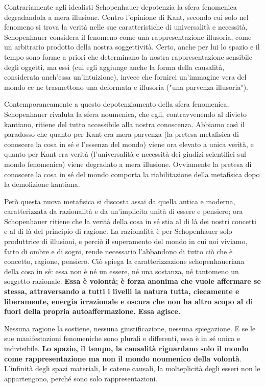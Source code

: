 Contrariamente agli idealisti Schopenhauer depotenzia la sfera fenomenica degradandola a mera illusione. Contro l’opinione di Kant, secondo cui solo nel fenomeno si trova la verità nelle sue caratteristiche di universalità e necessità, Schopenhauer considera il fenomeno come una rappresentazione illusoria, come un arbitrario prodotto della nostra soggettività. Certo, anche per lui lo spazio e il tempo sono forme a priori che determinano la nostra rappresentazione sensibile degli oggetti, ma essi (cui egli aggiunge anche la forma della causalità, considerata anch’essa un’intuizione), invece che fornirci un’immagine vera del mondo ce ne trasmettono una deformata e illusoria ("una parvenza illusoria").

Contemporaneamente a questo depotenziamento della sfera fenomenica, Schopenhauer rivaluta la sfera noumenica, che egli, contravvenendo al divieto kantiano, ritiene del tutto accessibile alla nostra conoscenza. Abbiamo così il paradosso che quanto per Kant era mera parvenza (la pretesa metafisica di conoscere la cosa in sé e l’essenza del mondo) viene ora elevato a unica verità, e quanto per Kant era verità (l’universalità e necessità dei giudizi scientifici sul mondo fenomenico) viene degradato a mera illusione. Ovviamente la pretesa di conoscere la cosa in sé del mondo comporta la riabilitazione della metafisica dopo la demolizione kantiana. 

Però questa nuova metafisica si discosta assai da quella antica e moderna, caratterizzata da razionalità e da un'implicita unità di essere e pensiero; ora Schopenhauer ritiene che la verità della cosa in sé stia al di là dei nostri concetti e al di là del principio di ragione. La razionalità è per Schopenhauer solo produttrice di illusioni, e perciò il superamento del mondo in cui noi viviamo, fatto di ombre e di sogni, rende necessario l’abbandono di tutto ciò che è concetto, ragione, pensiero. Ciò spiega la caratterizzazione schopenhaueriana della cosa in sé: essa non è né un essere, né una sostanza, né tantomeno un soggetto razionale. \textbf{Essa è volontà; è forza anonima che vuole affermare se stessa, attraversando a tutti i livelli la natura tutta, ciecamente e liberamente, energia irrazionale e oscura che non ha altro scopo al di fuori della propria autoaffermazione. Essa agisce.}

Nessuna ragione la sostiene, nessuna giustificazione, nessuna spiegazione. E se le sue manifestazioni fenomeniche sono plurali e differenti, essa è in sé unica e indivisibile.\textbf{ Lo spazio, il tempo, la causalità riguardano solo il mondo come rappresentazione ma non il mondo noumenico della volontà}. L’infinità degli spazi materiali, le catene causali, la molteplicità degli esseri non le appartengono, perché sono solo rappresentazioni.

